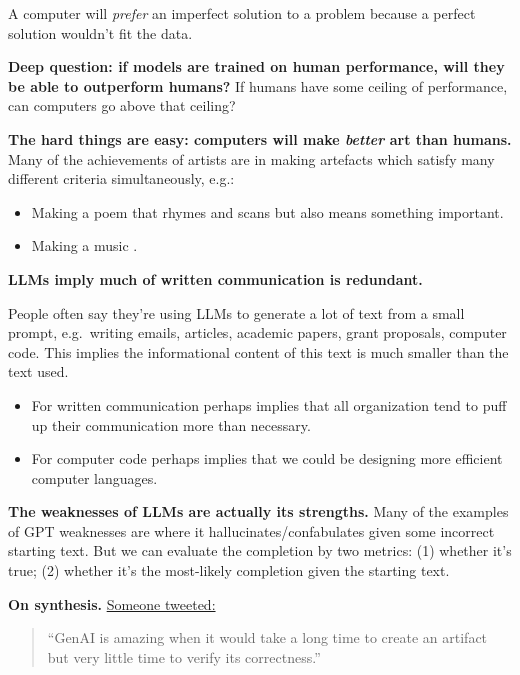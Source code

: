 \documentclass[
  11pt,
  letterpaper,
  DIV=11,
  numbers=noendperiod,
  oneside]{scrartcl}
\providecommand{\tightlist}{%
  \setlength{\itemsep}{0pt}\setlength{\parskip}{0pt}}\usepackage{longtable,booktabs,array}
\begin{document}
A computer will \emph{prefer} an imperfect solution to a problem because
a perfect solution wouldn't fit the data.

\textbf{Deep question: if models are trained on human performance, will
they be able to outperform humans?} If humans have some ceiling of
performance, can computers go above that ceiling?

\textbf{The hard things are easy: computers will make \emph{better} art
than humans.} Many of the achievements of artists are in making
artefacts which satisfy many different criteria simultaneously, e.g.:

\begin{itemize}
\tightlist
\item
  Making a poem that rhymes and scans but also means something
  important.
\item
  Making a music .
\end{itemize}

\textbf{LLMs imply much of written communication is redundant.}

People often say they're using LLMs to generate a lot of text from a
small prompt, e.g.~writing emails, articles, academic papers, grant
proposals, computer code. This implies the informational content of this
text is much smaller than the text used.

\begin{itemize}
\item
  For written communication perhaps implies that all organization tend
  to puff up their communication more than necessary.
\item
  For computer code perhaps implies that we could be designing more
  efficient computer languages.
\end{itemize}

\textbf{The weaknesses of LLMs are actually its strengths.} Many of the
examples of GPT weaknesses are where it hallucinates/confabulates given
some incorrect starting text. But we can evaluate the completion by two
metrics: (1) whether it's true; (2) whether it's the most-likely
completion given the starting text.

\textbf{On synthesis.}
\href{https://twitter.com/RichardSocher/status/1648735187088601088}{Someone
tweeted:}

\begin{quote}
``GenAI is amazing when it would take a long time to create an artifact
but very little time to verify its correctness.''
\end{quote}
\end{document}

